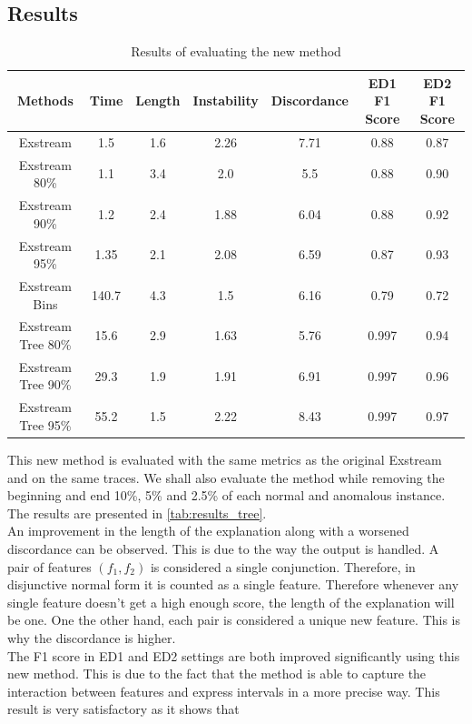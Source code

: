 \documentclass[oneside, a4paper, onecolumn, 11pt]{article}
\begin{document}
\subsection{Results}
\begin{table}[h]
  \centering
  \begin{tabular}{|c|c|c|c|c|c|c|}
      \hline
      Methods & Time & Length & Instability & Discordance & ED1 F1 Score & ED2 F1 Score\\ 
      \hline
      Exstream  & 1.5  & 1.6  & 2.26  & 7.71 & 0.88 & 0.87  \\ 
      Exstream 80\% & 1.1 & 3.4 & 2.0 & 5.5 & 0.88 & 0.90 \\
      Exstream 90\%  & 1.2  & 2.4  & 1.88  & 6.04 & 0.88 & 0.92\\ 
      Exstream 95\%  & 1.35  & 2.1  & 2.08  & 6.59 & 0.87 & 0.93\\ 
      Exstream Bins  & 140.7  & 4.3  & 1.5  & 6.16 & 0.79 & 0.72 \\ 
      Exstream Tree 80\%  & 15.6 & 2.9  & 1.63 & 5.76 & 0.997 & 0.94 \\ 
      Exstream Tree 90\%  & 29.3  & 1.9  & 1.91 & 6.91 & 0.997 & 0.96 \\ 
      Exstream Tree 95\%  & 55.2  & 1.5  & 2.22 & 8.43 & 0.997 & 0.97 \\ 
      \hline
  \end{tabular}
  \caption{Results of evaluating the new method}
  \label{tab:results_tree}
\end{table}
This new method is evaluated with the same metrics as the original Exstream and on the same traces. We shall also evaluate the method while removing the beginning and end 10\%, 5\% and 2.5\% of each normal and anomalous instance. The results are presented in \autoref{tab:results_tree}.\\
An improvement in the length of the explanation along with a worsened discordance can be observed. This is due to the way the output is handled. A pair of features $(f_1, f_2)$ is considered a single conjunction. Therefore, in disjunctive normal form it is counted as a single feature. Therefore whenever any single feature doesn't get a high enough score, the length of the explanation will be one. One the other hand, each pair is considered a unique new feature. This is why the discordance is higher.\\
The F1 score in ED1 and ED2 settings are both improved significantly using this new method. This is due to the fact that the method is able to capture the interaction between features and express intervals in a more precise way. This result is very satisfactory as it shows that 
\end{document}
